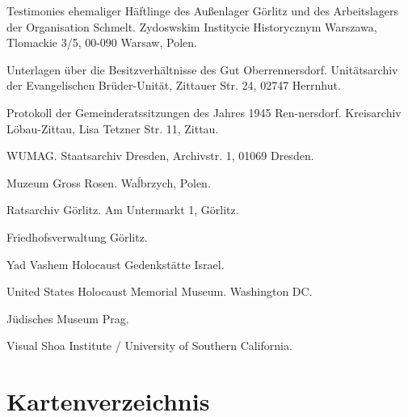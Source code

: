 \begin{thebibliography}{Archivalien}

\begin{footnotesize}

 {Testimonies ehemaliger Häftlinge des Außenlager Görlitz und des Arbeitslagers der Organisation Schmelt. Zydoswskim Institycie Historycznym Warszawa, Tlomackie 3/5, 00-090 Warsaw, Polen.}

 {Unterlagen über die Besitzverhältnisse des Gut Oberrennersdorf. Unitätsarchiv der Evangelischen Brüder-Unität, Zittauer Str. 24, 02747 Herrnhut.}

 
 {Protokoll der Gemeinderatssitzungen des Jahres 1945 Ren-nersdorf. Kreisarchiv Löbau-Zittau, Lisa Tetzner Str. 11, Zittau.}

 {WUMAG. Staatsarchiv Dresden, Archivstr. 1, 01069 Dresden.}
																					
 {Muzeum Gross Rosen. Wa\'lbrzych, Polen.}						

 {Ratsarchiv Görlitz. Am Untermarkt 1, Görlitz.}

 {Friedhofsverwaltung Görlitz.}

 {Yad Vashem Holocaust Gedenkstätte Israel.}

 {United States Holocaust Memorial Museum. Washington DC.}

 {Jüdisches Museum Prag.}

 {Visual Shoa Institute / University of Southern California.}

\end{footnotesize}
\end{thebibliography}




\section*{Kartenverzeichnis}
%
\listofmymaps




{}

{}


